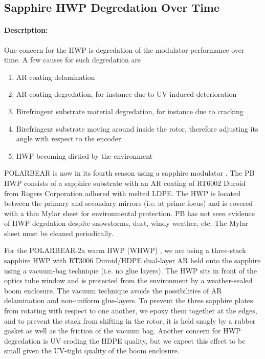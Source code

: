 \subsection{Sapphire HWP Degredation Over Time}

\paragraph{Description:} 

One concern for the HWP is degredation of the modulator performance over time. A few causes for such degredation are

\begin{enumerate}
	\item AR coating delamination
	\item AR coating degredation, for instance due to UV-induced deterioration
	\item Birefringent substrate material degredation, for instance due to cracking
	\item Birefringent substrate moving around inside the rotor, therefore adjusting its angle with respect to the encoder
	\item HWP becoming dirtied by the environment
\end{enumerate}

POLARBEAR is now in its fourth season using a sapphire modulator \cite{PB1_WHWP}. The PB HWP consists of a sapphire substrate with an AR coating of RT6002 Duroid from Rogers Corporation adhered with melted LDPE. The HWP is located between the primary and secondary mirrors (i.e. at prime focus) and is covered with a thin Mylar sheet for environmental protection. PB has not seen evidence of HWP degrdation despite snowstorms, dust, windy weather, etc. The Mylar sheet must be cleaned periodically.

For the POLARBEAR-2a warm HWP (WHWP) \cite{PB2a_WHWP}, we are using a three-stack sapphire HWP with RT3006 Duroid/HDPE dual-layer AR held onto the sapphire using a vacuum-bag technique (i.e. no glue layers). The HWP sits in front of the optics tube window and is protected from the environment by a weather-sealed boom enclosure. The vacuum technique avoids the possibilities of AR delamination and non-uniform glue-layers. To prevent the three sapphire plates from rotating with respect to one another, we epoxy them together at the edges, and to prevent the stack from shifting in the rotor, it is held snugly by a rubber gasket as well as the friction of the vacuum bag. Another concern for HWP degredation is UV eroding the HDPE quality, but we expect this effect to be small given the UV-tight quality of the boom enclosure.


